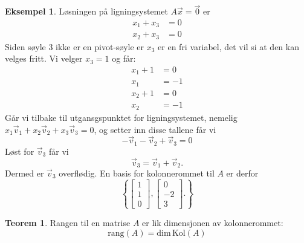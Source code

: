 \documentclass[11pt]{article}
\theoremstyle{definition}
\theoremstyle{definition}
\newtheorem{mitteks}{Eksempel}[section]
\theoremstyle{definition}
\theoremstyle{definition}
\newtheorem{teo}{Teorem}[section]
\newenvironment{fteo}
{\begin{mdframed}[style=minstil]\begin{teo}}
		{\end{teo}\end{mdframed}}
\theoremstyle{definition}
\theoremstyle{definition}
\begin{document}
\begin{mitteks}
			 Løsningen på ligningsystemet \(A\vec{x}=\vec{0} \) er
			 \begin{align*}
			 x_1+x_3&=0\\
			 x_2+x_3&=0
			 \end{align*}
			 Siden søyle 3 ikke er en pivot-søyle er \(x_3\) er en fri variabel, det vil si at den kan velges fritt. Vi velger \(x_3=1\) og får:
			 \begin{align*}
			 x_1+1&=0\\
			 x_1&=-1
			 \end{align*}
			 \begin{align*}
			 x_2+1&=0\\
			 x_2&=-1
			 \end{align*}
			 Går vi tilbake til utgansgspunktet for ligningsystemet, nemelig \(x_1\vec{v}_1+x_2\vec{v}_2+x_3\vec{v}_3=0\), og setter inn disse tallene får vi \[-\vec{v}_1-\vec{v}_2+\vec{v}_3=0 \]
			 Løst for \(\vec{v}_3 \) får vi
			 \[\vec{v}_3=\vec{v}_1+\vec{v}_2. \]
			 Dermed er \(\vec{v}_3 \) overflødig. En basis for kolonnerommet til \(A\) er derfor
			 \[\left\lbrace \left[\begin{array}{r} 
			 1 \\
			 1 \\
			 0
			 \end{array} \right],
			 \left[\begin{array}{r} 
			 0 \\
			 -2 \\
			 3
			 \end{array} \right].
			  \right\rbrace  \]
		\end{mitteks}
		
		\begin{fteo}
			Rangen til en matrise \(A\) er lik dimensjonen av kolonnerommet:
			\[\text{rang}(A)=\text{dim}\,\text{Kol}(A) \]
		\end{fteo}
		
\end{document}
